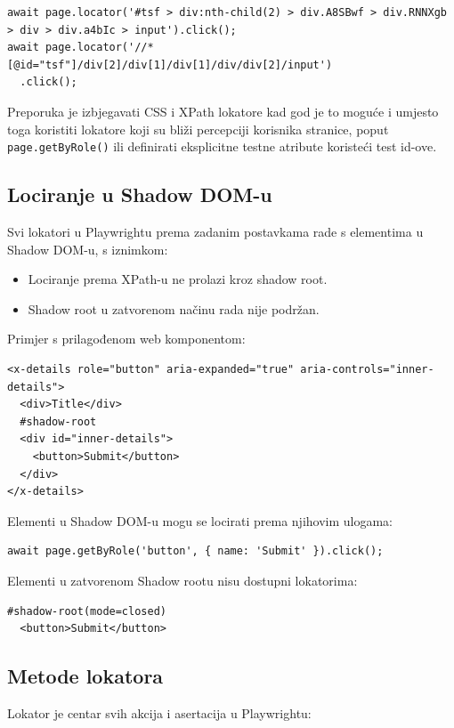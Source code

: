 \begin{verbatim}
await page.locator('#tsf > div:nth-child(2) > div.A8SBwf > div.RNNXgb > div > div.a4bIc > input').click();
await page.locator('//*[@id="tsf"]/div[2]/div[1]/div[1]/div/div[2]/input')
  .click();
\end{verbatim}

Preporuka je izbjegavati CSS i XPath lokatore kad god je to moguće i umjesto toga koristiti lokatore koji su bliži percepciji korisnika stranice, poput \texttt{page.getByRole()} ili definirati eksplicitne testne atribute koristeći test id-ove.

\subsection*{Lociranje u Shadow DOM-u}

Svi lokatori u Playwrightu prema zadanim postavkama rade s elementima u Shadow DOM-u, s iznimkom:
\begin{itemize}
\item Lociranje prema XPath-u ne prolazi kroz shadow root.
\item Shadow root u zatvorenom načinu rada nije podržan.
\end{itemize}

Primjer s prilagođenom web komponentom:

\begin{verbatim}
<x-details role="button" aria-expanded="true" aria-controls="inner-details">
  <div>Title</div>
  #shadow-root
  <div id="inner-details">
    <button>Submit</button>
  </div>
</x-details>
\end{verbatim}

Elementi u Shadow DOM-u mogu se locirati prema njihovim ulogama:

\begin{verbatim}
await page.getByRole('button', { name: 'Submit' }).click();
\end{verbatim}

Elementi u zatvorenom Shadow rootu nisu dostupni lokatorima:

\begin{verbatim}
#shadow-root(mode=closed)
  <button>Submit</button>
\end{verbatim}

\subsection*{Metode lokatora}

Lokator je centar svih akcija i asertacija u Playwrightu:

